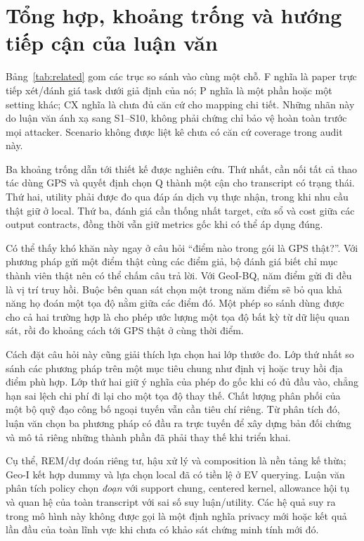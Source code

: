 \section{Tổng hợp, khoảng trống và hướng tiếp cận của luận văn}
Bảng~\ref{tab:related} gom các trục so sánh vào cùng một chỗ. F nghĩa là paper trực tiếp xét/đánh giá
task dưới giả định của nó; P nghĩa là một phần hoặc một setting khác; CX nghĩa là chưa đủ căn cứ
cho mapping chi tiết. Những nhãn này do luận văn ánh xạ sang S1--S10, không phải chứng chỉ bảo vệ
hoàn toàn trước mọi attacker. Scenario không được liệt kê chưa có căn cứ coverage trong audit này.


Ba khoảng trống dẫn tới thiết kế được nghiên cứu. Thứ nhất, cần nối tất cả thao tác dùng GPS và
quyết định chọn Q thành một cận cho transcript có trạng thái. Thứ hai, utility phải được đo qua
đáp án dịch vụ thực nhận, trong khi nhu cầu thật giữ ở local. Thứ ba, đánh giá cần thống nhất target,
cửa sổ và cost giữa các output contracts, đồng thời vẫn giữ metrics gốc khi có thể áp dụng đúng.

Có thể thấy khó khăn này ngay ở câu hỏi “điểm nào trong gói là GPS thật?”. Với phương pháp gửi
một điểm thật cùng các điểm giả, bộ đánh giá biết chỉ mục thành viên thật nên có thể chấm câu
trả lời. Với GeoI-BQ, năm điểm gửi đi đều là vị trí truy hồi. Buộc bên quan sát chọn một trong
năm điểm sẽ bỏ qua khả năng họ đoán một tọa độ nằm giữa các điểm đó. Một phép so sánh dùng
được cho cả hai trường hợp là cho phép ước lượng một tọa độ bất kỳ từ dữ liệu quan sát, rồi
đo khoảng cách tới GPS thật ở cùng thời điểm.

Cách đặt câu hỏi này cũng giải thích lựa chọn hai lớp thước đo. Lớp thứ nhất so sánh các
phương pháp trên một mục tiêu chung như định vị hoặc truy hồi địa điểm phù hợp. Lớp thứ hai
giữ ý nghĩa của phép đo gốc khi có đủ đầu vào, chẳng hạn sai lệch chi phí đi lại cho một tọa
độ thay thế. Chất lượng phân phối của một bộ quỹ đạo công bố ngoại tuyến vẫn cần tiêu chí
riêng. Từ phân tích đó, luận văn chọn ba phương pháp có đầu ra trực tuyến để xây dựng bản
đối chứng và mô tả riêng những thành phần đã phải thay thế khi triển khai.

Cụ thể, REM/dự đoán riêng tư, hậu xử lý và composition là nền tảng kế thừa; Geo-I kết hợp dummy
và lựa chọn local đã có tiền lệ ở EV querying. Luận văn phân tích policy chọn \emph{đoạn} với
support chung, centered kernel, allowance hội tụ và quan hệ của toàn transcript với sai số suy
luận/utility. Các hệ quả suy ra trong mô hình này không được gọi là một định nghĩa privacy mới
hoặc kết quả lần đầu của toàn lĩnh vực khi chưa có khảo sát chứng minh tính mới đó.
